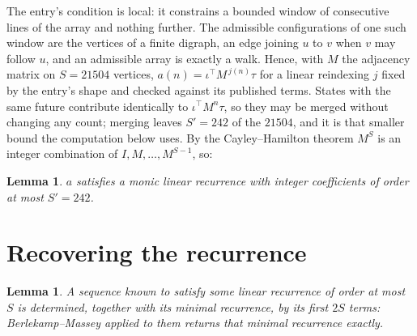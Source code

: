 \documentclass[11pt,a4paper]{article}
\theoremstyle{plain}
\newtheorem{lemma}[theorem]{Lemma}
\theoremstyle{definition}
\begin{document}
The entry's condition is local: it constrains a bounded window of consecutive lines of the
array and nothing further. The admissible configurations of one such window are the vertices
of a finite digraph, an edge joining $u$ to $v$ when $v$ may follow $u$, and an admissible
array is exactly a walk. Hence, with $M$ the adjacency matrix on $S=21504$ vertices,
$a(n)=\iota^{\!\top}M^{\,j(n)}\tau$ for a linear reindexing $j$ fixed by the entry's shape
and checked against its published terms. States with the same future contribute identically to $\iota^{\!\top}M^n\tau$, so they may be merged without changing any count; merging leaves $S'=242$ of the $21504$, and it is that smaller bound the computation below uses. By the Cayley--Hamilton theorem $M^{S}$ is an
integer combination of $I,M,\dots,M^{S-1}$, so:

\begin{lemma}\label{lem:cf}
$a$ satisfies a monic linear recurrence with integer coefficients of order at most
$S'=242$.
\end{lemma}

\section{Recovering the recurrence}

\begin{lemma}\label{lem:bm}
A sequence known to satisfy some linear recurrence of order at most $S$ is determined, together
with its minimal recurrence, by its first $2S$ terms: Berlekamp--Massey applied to them returns
that minimal recurrence exactly.
\end{lemma}
\end{document}
